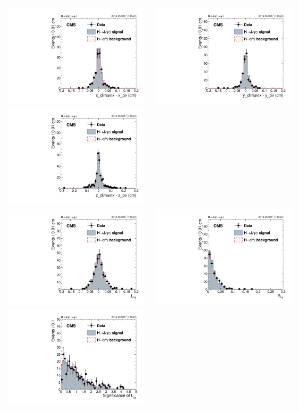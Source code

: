 		\begin{figure}[p]
		  \centering
		  \includegraphics[width=0.32\textwidth]{Fig/Final_NoPreliminary/HJpsiG/VtxDispX_Norm_Inclusive}~
		  \includegraphics[width=0.32\textwidth]{Fig/Final_NoPreliminary/HJpsiG/VtxDispY_Norm_Inclusive}~
		  \includegraphics[width=0.32\textwidth]{Fig/Final_NoPreliminary/HJpsiG/VtxDispZ_Norm_Inclusive}\\
		  \includegraphics[width=0.32\textwidth]{Fig/Final_NoPreliminary/HJpsiG/Lxy_Norm_Inclusive}~
		  \includegraphics[width=0.32\textwidth]{Fig/Final_NoPreliminary/HJpsiG/Rxy_Norm_Inclusive}~
		  \includegraphics[width=0.32\textwidth]{Fig/Final_NoPreliminary/HJpsiG/SLxy_Norm_Inclusive}\\

\end{figure}

